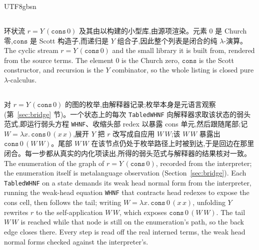 \begin{CJK*}{UTF8}{gbsn}
  \subsection{}\label{app:cyclic-zeros-code}
  \ifPaperChinese
  环状流 $r = Y\,(\mathtt{cons}\,0)$ 及其由以构建的小型库,由源项渲染。元素 $0$ 是 Church 零,$\mathtt{cons}$ 是 Scott 构造子,而递归是 $Y$ 组合子,因此整个列表是闭合的纯 $\lambda$-演算。
  \else
  The cyclic stream $r = Y\,(\mathtt{cons}\,0)$ and the small library it is built from, rendered from the source terms. The element $0$ is the Church zero, $\mathtt{cons}$ is the Scott constructor, and recursion is the $Y$ combinator, so the whole listing is closed pure $\lambda$-calculus.
  \fi
  

  \subsection{}\label{app:cyclic-zeros-trace}
  \ifPaperChinese
  对 $r = Y\,(\mathtt{cons}\,0)$ 的图的枚举,由解释器记录;枚举本身是元语言观察(第~\ref{sec:bridge} 节)。一个状态上的每次 \texttt{TabledWHNF} 向解释器求取该状态的弱头范式,即运行弱头方程 \texttt{WHNF}、收缩头部 redex 以暴露 cons 单元,然后跟随尾部;记 $W = \lambda x.\,\mathtt{cons}\,0\,(x\,x)$,展开 $Y$ 把 $r$ 改写成自应用 $W\,W$;该 $W\,W$ 暴露出 $\mathtt{cons}\,0\,(W\,W)$。尾部 $W\,W$ 在该节点仍处于枚举路径上时被到达,于是回边在那里闭合。每一步都从真实的内化项读出,所得的弱头范式与解释器的结果核对一致。
  \else
  The enumeration of the graph of $r = Y\,(\mathtt{cons}\,0)$, recorded from the interpreter; the enumeration itself is metalanguage observation (Section~\ref{sec:bridge}). Each \texttt{TabledWHNF} on a state demands its weak head normal form from the interpreter, running the weak-head equation \texttt{WHNF} that contracts head redexes to expose the cons cell, then follows the tail; writing $W = \lambda x.\,\mathtt{cons}\,0\,(x\,x)$, unfolding $Y$ rewrites $r$ to the self-application $W\,W$, which exposes $\mathtt{cons}\,0\,(W\,W)$. The tail $W\,W$ is reached while that node is still on the enumeration's path, so the back edge closes there. Every step is read off the real interned terms, the weak head normal forms checked against the interpreter's.
  \fi
  


\end{CJK*}
